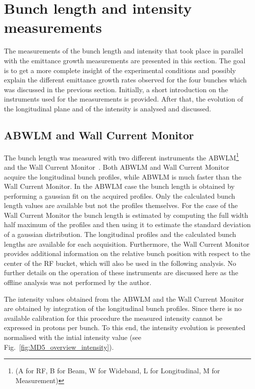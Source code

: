 \section{Bunch length and intensity measurements}\label{sec:bunch_length_intensity_meas_2018}
The measurements of the bunch length and intensity that took place in parallel with the emittance growth measurements are presented in this section. The goal is to get a more complete insight of the experimental conditions and possibly explain the different emittance growth rates observed for the four bunches which was discussed in the previous section. Initially, a short introduction on the instruments used for the measurements is provided. After that, the evolution of the longitudinal plane and of the intensity is analysed and discussed.

\subsection{ABWLM and Wall Current Monitor}\label{sec:ABWLM_WallCurrentMonitor}
The bunch length was measured with two different instruments the ABWLM\footnote{(A for RF, B for Beam, W for Wideband, L for Longitudinal, M for Measurement)}~\cite{ABWLM} and the Wall Current Monitor~\cite{Papotti:1124099}. Both ABWLM and Wall Current Monitor acquire the longitudinal bunch profiles, while ABWLM is much faster than the Wall Current Monitor. %
In the ABWLM case the bunch length is obtained by performing a gaussian fit on the acquired profiles. Only the calculated bunch length values are available but not the profiles themselves. For the case of the Wall Current Monitor the bunch length is estimated by computing the full width half maximum of the profiles and then using it to estimate the standard deviation of a gaussian distribution. The longitudinal profiles and the calculated bunch lengths are available for each acquisition. Furthermore, the Wall Current Monitor provides additional information on the relative bunch position with respect to the center of the RF bucket, which will also be used in the following analysis. No further details on the operation of these instruments are discussed here as the offline analysis was not performed by the author. %

The intensity values obtained from the ABWLM and the Wall Current Monitor are obtained by integration of the longitudinal bunch profiles. Since there is no available calibration for this procedure the measured intensity cannot be expressed in protons per bunch. To this end, the intensity evolution is presented normalised with the intial intensity value (see Fig.~\ref{fig:MD5_overview_intensity}). 

